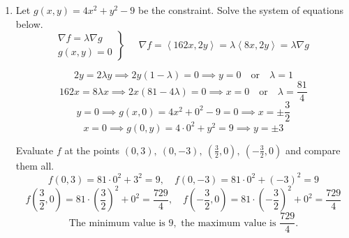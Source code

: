\documentclass[a4paper, 12pt]{article}
\begin{document}
\begin{enumerate}[leftmargin=*,label=\textbf{\arabic*.}]
The critical points are $(0,0)$ and $(1,1)$. To classify these points, calculate the second partial derivatives and then find the Hessian determinants.
\[f_{xx}=6x,\quad f_{xy}=f_{yx}=-3,\quad f_{yy}=6y\]
\[(0,0)\rightarrow\left\{\:\begin{array}{l}
f_{xx}=0,\quad f_{xy}=-3,\quad f_{yy}=0\\[1em]
\left|\begin{array}{cc}
0 & -3\\
-3 & 0
\end{array}\right|=0\cdot0-(-3)\cdot(-3)=-9<0
\end{array}\right.\]
\[(1,1)\rightarrow\left\{\:\begin{array}{l}
f_{xx}=6,\quad f_{xy}=-3,\quad f_{yy}=6\\[1em]
\left|\begin{array}{cc}
6 & -3\\
-3 & 6
\end{array}\right|=6\cdot6-(-3)\cdot (-3)=27>0,\quad f_{xx}>0
\end{array}\right.\]

\[\boxed{\text{A local minimum occurs at }(1,1)\text{ and a saddle point occurs at }(0,0).}\]

\item Let $g(x,y)=4x^2+y^2-9$ be the constraint. Solve the system of equations below.
\[
\left.
\begin{array}{c}
\displaystyle\nabla f=\lambda\nabla g\\
\displaystyle g(x,y)=0
\end{array}
\right\}\quad
\begin{array}{l}
\nabla f=\left\langle162x,2y\right\rangle=\lambda\left\langle8x,2y\right\rangle=\lambda\nabla g
\end{array}
\]

\[2y=2\lambda y\implies 2y(1-\lambda)=0\implies y=0\quad\text{or}\quad\lambda=1\]
\[162x=8\lambda x\implies 2x(81-4\lambda)=0\implies x=0\quad\text{or}\quad\lambda=\frac{81}4\]
\[y=0\implies g(x,0)=4x^2+0^2-9=0\implies x=\pm\frac32\]
\[x=0\implies g(0,y)=4\cdot0^2+y^2=9\implies y=\pm3\]

Evaluate $f$ at the points $(0,3),\:(0,-3),\:\left(\frac32,0\right),\:\left(-\frac32,0\right)$ and compare them all.
\[f\left(0,3\right)=81\cdot0^2+3^2=9,\quad f\left(0,-3\right)=81\cdot0^2+(-3)^2=9\]
\[f\left(\frac32,0\right)=81\cdot\left(\frac32\right)^2+0^2=\frac{729}4,\quad f\left(-\frac32,0\right)=81\cdot\left(-\frac32\right)^2+0^2=\frac{729}4\]
\[\boxed{\text{The minimum value is }9,\text{ the maximum value is }\frac{729}4.}\]


\end{enumerate}
\end{document}
